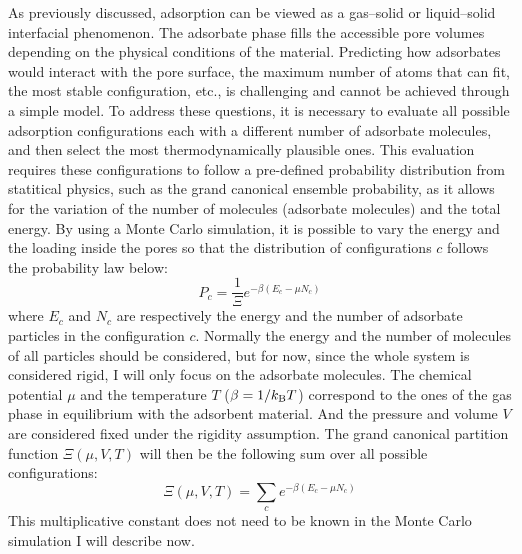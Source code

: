 \documentclass[main.tex]{subfiles}
\begin{document}
As previously discussed, adsorption can be viewed as a gas--solid or liquid--solid interfacial phenomenon. The adsorbate phase fills the accessible pore volumes depending on the physical conditions of the material. Predicting how adsorbates would interact with the pore surface, the maximum number of atoms that can fit, the most stable configuration, etc., is challenging and cannot be achieved through a simple model. To address these questions, it is necessary to evaluate all possible adsorption configurations each with a different number of adsorbate molecules, and then select the most thermodynamically plausible ones. This evaluation requires these configurations to follow a pre-defined probability distribution from statitical physics, such as the grand canonical ensemble probability, as it allows for the variation of the number of molecules (adsorbate molecules) and the total energy. By using a Monte Carlo simulation, it is possible to vary the energy and the loading inside the pores so that the distribution of configurations $c$ follows the probability law below: 
\begin{equation}\label{eq:gc}
  P_c = \dfrac{1}{\Xi}e^{-\beta\left(E_c-\mu N_c\right)} 
\end{equation}
where $E_c$ and $N_c$ are respectively the energy and the number of adsorbate particles in the configuration $c$. Normally the energy and the number of molecules of all particles should be considered, but for now, since the whole system is considered rigid, I will only focus on the adsorbate molecules. The chemical potential $\mu$ and the temperature $T$ ($\beta=1/k_{\text{B}}T$) correspond to the ones of the gas phase in equilibrium with the adsorbent material. And the pressure and volume $V$ are considered fixed under the rigidity assumption. The grand canonical partition function $\Xi(\mu,V,T)$ will then be the following sum over all possible configurations: 
\begin{equation}
  \Xi(\mu,V,T) = \sum\limits_c e^{-\beta\left(E_c-\mu N_c\right)} 
\end{equation}
This multiplicative constant does not need to be known in the Monte Carlo simulation I will describe now. 
\end{document}
